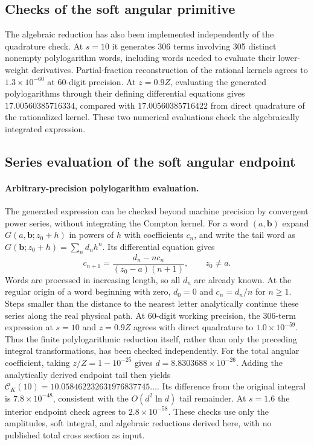 \subsection{Checks of the soft angular primitive}
The algebraic reduction has also been implemented independently of the
quadrature check. At $s=10$ it generates 306 terms involving 305 distinct
nonempty polylogarithm words, including words needed to evaluate their
lower-weight derivatives. Partial-fraction reconstruction of the
rational kernels agrees to $1.3\times10^{-60}$ at 60-digit precision.
At $z=0.9Z$, evaluating the generated polylogarithms through their defining
differential equations gives $17.00560385716334$, compared with
$17.00560385716422$ from direct quadrature of the rationalized kernel.
These two numerical evaluations check the algebraically integrated expression.

\subsection{Series evaluation of the soft angular endpoint}
\paragraph{Arbitrary-precision polylogarithm evaluation.}
The generated expression can be checked beyond machine precision by
convergent power series, without integrating the Compton kernel. For a
word $(a,\boldsymbol b)$ expand $G(a,\boldsymbol b;z_0+h)$ in powers of
$h$ with coefficients $c_n$, and write the tail word as
$G(\boldsymbol b;z_0+h)=\sum_n d_nh^n$. Its differential equation gives
\begin{equation}
 c_{n+1}=\frac{d_n-nc_n}{(z_0-a)(n+1)},\qquad z_0\ne a.
\end{equation}
Words are processed in increasing length, so all $d_n$ are already known.
At the regular origin of a word beginning with zero, $d_0=0$ and
$c_n=d_n/n$ for $n\geq1$. Steps smaller than the distance to the nearest
letter analytically continue these series along the real physical path.
At 60-digit working precision, the 306-term expression at $s=10$ and
$z=0.9Z$ agrees with direct quadrature to $1.0\times10^{-59}$.
Thus the finite polylogarithmic reduction itself, rather than only the
preceding integral transformations, has been checked independently.
For the total angular coefficient, taking
$z/Z=1-10^{-25}$ gives $d=8.8303688\times10^{-26}$.
Adding the analytically derived endpoint tail then yields
$\mathcal C_K(10)=10.058462232631976837745\ldots$.
Its difference from the original integral is $7.8\times10^{-48}$,
consistent with the $O(d^2\ln d)$ tail remainder. At $s=1.6$ the
interior endpoint check agrees to $2.8\times10^{-58}$.
These checks use only the amplitudes, soft integral, and algebraic
reductions derived here, with no published total cross section as input.

